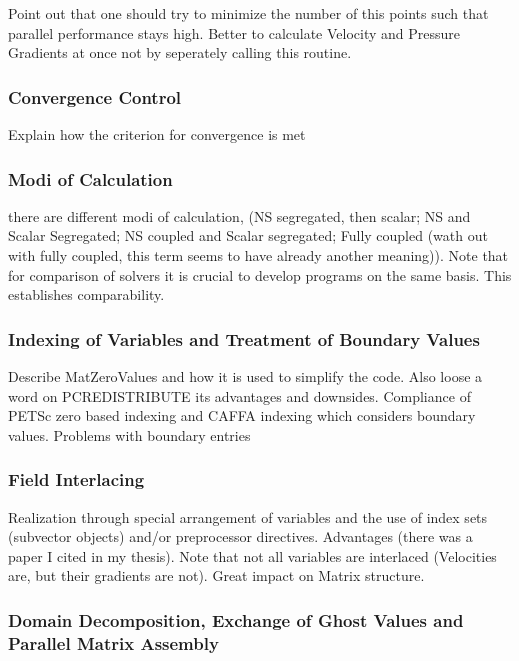 \documentclass[article,type=msc,colorback,accentcolor=tud2a]{tudthesis}
\begin{document}
        Point out that one should try to minimize the number of this points such that parallel performance stays high. Better to calculate Velocity and Pressure Gradients at once not by seperately calling this routine.

        \subsubsection{Convergence Control} 
        Explain how the criterion for convergence is met 

        \subsubsection{Modi of Calculation}
          there are different modi of calculation, (NS segregated, then scalar; NS and Scalar Segregated; NS coupled and Scalar segregated; Fully coupled (wath out with fully coupled, this term seems to have already another meaning)). Note that for comparison of solvers it is crucial to develop programs on the same basis. This establishes comparability.

      \subsubsection{Indexing of Variables and Treatment of Boundary Values}
      Describe MatZeroValues and how it is used to simplify the code. Also loose a word on PCREDISTRIBUTE its advantages and downsides. Compliance of PETSc zero based indexing and CAFFA indexing which considers boundary values. Problems with boundary entries
      \subsubsection{Field Interlacing}
      Realization through special arrangement of variables and the use of index sets (subvector objects) and/or preprocessor directives. Advantages (there was a paper I cited in my thesis). Note that not all variables are interlaced (Velocities are, but their gradients are not). Great impact on Matrix structure.
      \subsubsection{Domain Decomposition, Exchange of Ghost Values and Parallel Matrix Assembly}
\end{document}
